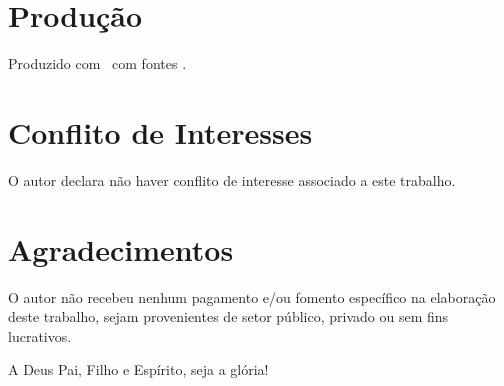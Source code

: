 \sloppy


\section*{Produção}

    Produzido com \XeLaTeX\ com fontes .



\section*{Conflito de Interesses}

    O autor declara não haver conflito de interesse associado a este trabalho.



\section*{Agradecimentos}

    O autor não recebeu nenhum pagamento e/ou fomento específico na elaboração  deste  trabalho,  sejam  provenientes  de  setor
    público, privado ou sem fins lucrativos.

    A \YA{} Deus Pai, Filho e Espírito, seja a glória!




